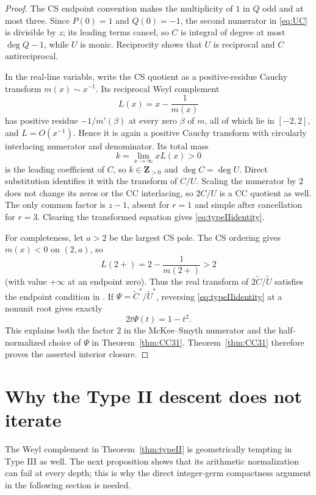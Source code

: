 \documentclass[11pt,reqno]{amsart}
\theoremstyle{definition}
\theoremstyle{remark}
\newcommand{\Z}{\mathbf Z}
\begin{document}
\begin{proof}
The CS endpoint convention makes the multiplicity of $1$ in $Q$ odd and at
most three.  Since $P(0)=1$ and $Q(0)=-1$, the second numerator in
\eqref{eq:UC} is divisible by $z$; its leading terms cancel, so $C$ is
integral of degree at most $\deg Q-1$, while $U$ is monic.  Reciprocity shows
that $U$ is reciprocal and $C$ antireciprocal.

In the real-line variable, write the CS quotient as a positive-residue
Cauchy transform $m(x)\sim x^{-1}$.  Its reciprocal Weyl complement
\[
 L(x)=x-\frac1{m(x)}
\]
has positive residue $-1/m'(\beta)$ at every zero $\beta$ of $m$, all of
which lie in $[-2,2]$, and $L=O(x^{-1})$.  Hence it is again a positive
Cauchy transform with circularly interlacing numerator and denominator.
Its total mass
\[
 k=\lim_{x\to\infty}xL(x)>0
\]
is the leading coefficient of $C$, so $k\in\Z_{>0}$ and
$\deg C=\deg U$.
Direct substitution identifies it with the transform of $C/U$.  Scaling the
numerator by $2$ does not change its zeros or the CC interlacing, so
$2C/U$ is a CC quotient as well.  The only common factor is $z-1$, absent
for $r=1$ and simple after cancellation for $r=3$.  Clearing the transformed equation gives
\eqref{eq:typeIIidentity}.

For completeness, let $a>2$ be the largest CS pole.  The CS ordering gives
$m(x)<0$ on $(2,a)$, so
\[
 L(2+)=2-\frac1{m(2+)}>2
\]
(with value $+\infty$ at an endpoint zero).  Thus the real transform of
$2\widetilde C/\widetilde U$ satisfies the endpoint condition in
\cite[Thm.~3.1]{mckeesmyth}.  If
$\Psi=\widetilde C^*/\widetilde U^*$, reversing
\eqref{eq:typeIIidentity} at a nonunit root gives exactly
\[
 2t\Psi(t)=1-t^2.
\]
This explains both the factor $2$ in the McKee--Smyth numerator and the
half-normalized choice of $\Psi$ in Theorem~\ref{thm:CC31}.
Theorem~\ref{thm:CC31} therefore proves the asserted interior closure.
\end{proof}

\section{Why the Type II descent does not iterate}

The Weyl complement in Theorem~\ref{thm:typeII} is geometrically tempting in
Type III as well.  The next proposition shows that its arithmetic
normalization can fail at every depth; this is why the direct integer-germ
compactness argument in the following section is needed.
\end{document}
